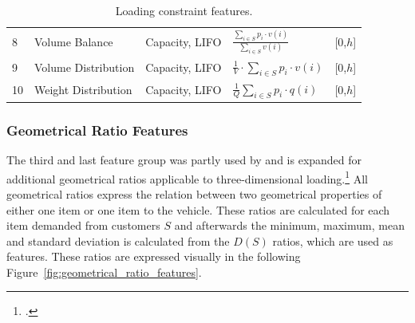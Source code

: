 \begin{table}[!ht]
\begin{tabular}{@{}P{0.08\textwidth}P{0.16\textwidth}P{0.26\textwidth}P{0.28\textwidth}@{}P{0.1\textwidth}@{}}
        8  & Volume Balance                                                                                   & Capacity, \gls{LIFO}   & $\frac{\displaystyle\sum\nolimits_{i \in S}p_i \cdot v(i)}{\displaystyle\sum\nolimits_{i \in S}v(i)}$ & [0,$h$] \\
        9  & Volume Distribution                                                                              & Capacity, \gls{LIFO}   & $\displaystyle\frac{1}{V}\cdot\sum_{i \in S}p_i \cdot v(i)$                                           & [0,$h$] \\
        10 & Weight Distribution                                                                              & Capacity, \gls{LIFO}   & $\displaystyle\frac{1}{Q}\sum_{i \in S}p_i \cdot q(i)$                                                & [0,$h$] \\
        \bottomrule
    \end{tabular}
    \caption{Loading constraint features.}
    \label{tab:loading_constraints_features}
\end{table}


\subsubsection{Geometrical Ratio Features}
The third and last feature group
was partly used by \cite{zhang_learning-based_2022} and is expanded for additional geometrical ratios applicable to three-dimensional loading.\footcite[cf.][p. 14]{zhang_learning-based_2022}
All geometrical ratios express the relation between two geometrical properties of either one item or one item to the vehicle. These ratios
are calculated for each item demanded from customers $S$ and afterwards the minimum, maximum, mean and standard deviation is calculated
from the $D(S)$ ratios, which are used as features. These ratios are expressed visually in the following Figure~\ref{fig:geometrical_ratio_features}.


